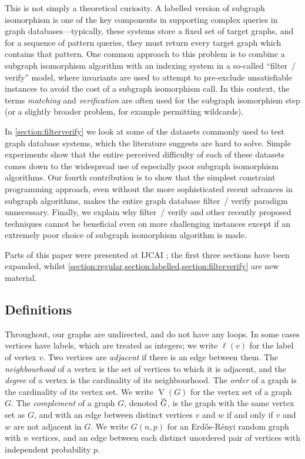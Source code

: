 \documentclass[twoside,11pt]{article}
\newcommand{\citep}[1]{\cite{#1}}
\newcommand{\shortoverline}[1]{\mkern 1.5mu\overline{\mkern-1.5mu#1\mkern-1.5mu}\mkern 1.5mu}
\begin{document}
This is not simply a theoretical curiosity. A labelled version of subgraph isomorphism is one of
the key components in supporting complex queries in graph databases---typically, these systems store
a fixed set of target graphs, and for a sequence of pattern queries, they must return every target
graph which contains that pattern.  One common approach to this problem is to combine a subgraph
isomorphism algorithm with an indexing system in a so-called ``filter~/ verify'' model, where
invariants are used to attempt to pre-exclude unsatisfiable instances to avoid the cost of a
subgraph isomorphism call. In this context, the terms \emph{matching} and \emph{verification} are
often used for the subgraph isomorphism step (or a slightly broader problem, for example permitting
wildcards).

In \cref{section:filterverify} we look at some of the datasets commonly used to test graph database
systems, which the literature suggests are hard to solve. Simple experiments show that the entire
perceived difficulty of each of these datasets comes down to the widespread use of especially poor
subgraph isomorphism algorithms. Our fourth contribution is to show that the simplest constraint
programming approach, even without the more sophisticated recent advances in subgraph algorithms,
makes the entire graph database filter~/ verify paradigm unnecessary.  Finally, we explain why
filter~/ verify and other recently proposed techniques cannot be beneficial even on more challenging
instances except if an extremely poor choice of subgraph isomorphism algorithm is made.

\bigskip

Parts of this paper were presented at IJCAI \citep{DBLP:conf/ijcai/McCreeshPT16}; the first three
sections have been expanded, whilst
\cref{section:regular,section:labelled,section:filterverify} are new material.

\subsection{Definitions}

Throughout, our graphs are undirected, and do not have any loops. In some cases vertices have
labels, which are treated as integers; we write $\ell(v)$ for the label of vertex $v$. Two vertices
are \emph{adjacent} if there is an edge between them. The \emph{neighbourhood} of a vertex is the
set of vertices to which it is adjacent, and the \emph{degree} of a vertex is the cardinality of its
neighbourhood. The \emph{order} of a graph is the cardinality of its vertex set. We write
$\operatorname{V}(G)$ for the vertex set of a graph $G$. The \emph{complement} of a graph $G$,
denoted $\shortoverline{G}$, is the graph with the same vertex set as $G$, and with an edge between
distinct vertices $v$ and $w$ if and only if $v$ and $w$ are not adjacent in $G$. We write $G(n, p)$
for an Erd\H{o}s-R\'enyi random graph with $n$ vertices, and an edge between each distinct unordered
pair of vertices with independent probability $p$.
\end{document}
